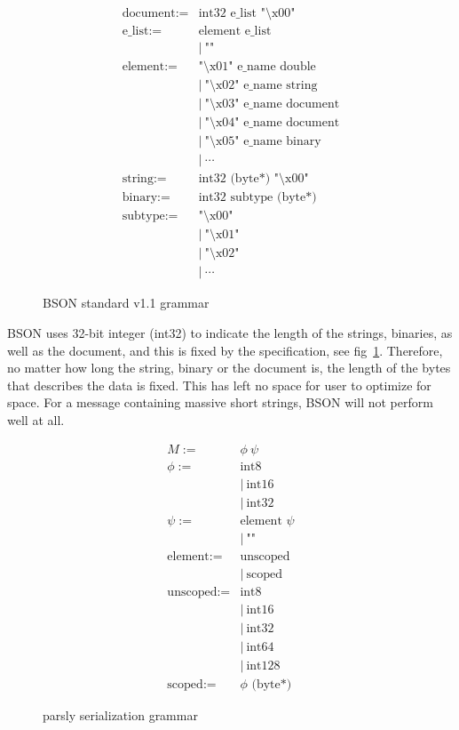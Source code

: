 \documentclass{article}
\begin{document}
\begin{figure}[h!]
\begin{align*}
\text{document} :=&  \text{int32 e\_list "\textbackslash x00" } \\
\text{e\_list} :=& \text{element e\_list} \\
&| \ \text{""} \\
\text{element}	:=& \text{"\textbackslash x01" e\_name double} \\
&| \ \text{"\textbackslash x02" e\_name string} \\
&| \ \text{"\textbackslash x03" e\_name document} \\
&| \ \text{"\textbackslash x04" e\_name document} \\
&| \ \text{"\textbackslash x05" e\_name binary} \\
&| \ \cdots \\
\text{string} :=& \text{int32 (byte*) "\textbackslash x00"} \\
\text{binary} :=& \text{int32 subtype (byte*)} \\
\text{subtype} :=& \text{"\textbackslash x00"} \\
&| \ \text{"\textbackslash x01"} \\
&| \ \text{"\textbackslash x02"} \\
&| \ \cdots 
\end{align*}
\caption{BSON standard v1.1 grammar}
\label{eq:bsonGrammar}
\end{figure}

BSON uses 32-bit integer (int32) to indicate the length of the strings, binaries, as well as the document, and this is fixed by the specification, see fig~\ref{eq:bsonGrammar}. Therefore, no matter how long the string, binary or the document is, the length of the bytes that describes the data is fixed. This has left no space for user to optimize for space. For a message containing massive short strings, BSON will not perform well at all.  \\

\begin{figure}[h!]
\begin{align*}
M :=& \phi \ \psi \\
\phi :=& \text{int8} \\
&| \ \text{int16} \\
&| \ \text{int32} \\
\psi :=& \text{element } \psi \\
&| \ \text{""} \\
\text{element}	:=& \text{unscoped} \\
&| \ \text{scoped} \\
\text{unscoped} :=& \text{int8} \\
&| \ \text{int16} \\
&| \ \text{int32} \\
&| \ \text{int64} \\
&| \ \text{int128} \\
\text{scoped} :=& \phi  \text{ (byte*)} 
\end{align*}
\caption{parsly serialization grammar}
\label{eq:parslyGrammar}
\end{figure}
\end{document}
